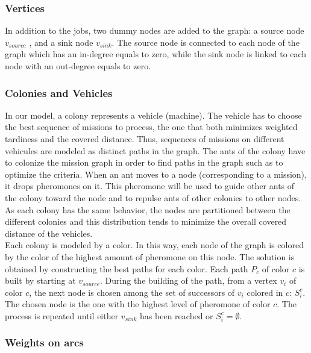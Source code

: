\documentclass[a4paper,10pt]{article}
\begin{document}
\subsubsection{Vertices}

In addition to the jobs, two dummy nodes are added to the graph: a source node $v_{source}$ , and a sink node $v_{sink}$. The source node is connected to each node of the graph which has an in-degree equals to zero, while the sink node is linked to each node with an out-degree equals to zero. %

\subsubsection{Colonies and Vehicles}

In our model, a colony represents a vehicle (machine). The vehicle has to choose the best sequence of missions to process, the one that both minimizes weighted tardiness and the covered distance. Thus, sequences of missions on different vehicules are modeled as distinct paths in the graph. The ants of the colony have to colonize the mission graph in order to find paths in the graph such as to optimize the criteria. When an ant moves to a node (corresponding to a mission), it drops pheromones on it. This pheromone will be used to guide other ants of the colony toward the node and to repulse ants of other colonies to other nodes. As each colony has the same behavior, the nodes are partitioned between the different colonies and this distribution tends to minimize the overall covered distance of the vehicles.\\

Each colony is modeled by a color. In this way, each node of the graph is colored by the color of the highest amount of pheromone on this node. The solution is obtained by constructing the best paths for each color. Each path $P_c$ of color $c$ is built by starting at $v_{source}$. During the building of the path, from a vertex $v_i$ of color $c$, the next node is chosen among the set of successors of $v_i$ colored in $c$: $S_i^c$. The chosen node is the one with the highest level of pheromone of color $c$. The process is repeated until either $v_{sink}$ has been reached or $S_i^c = \emptyset$.

\subsubsection{Weights on arcs}
\end{document}
